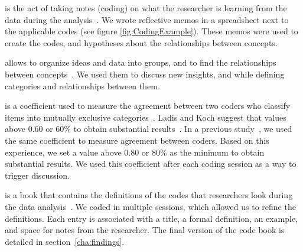 	\begin{description}[itemsep=3pt, topsep=2pt, leftmargin=3em, parsep=0pt]
		\item[Memoing] is the act of taking notes (coding) on what the researcher is learning from the data during the analysis~\cite{Groenewald2008}.%
We wrote reflective memos in a spreadsheet next to the applicable codes (see figure \ref{fig:CodingExample}).
These memos were used to create the codes, and hypotheses about the relationships between concepts.

		\item[Affinity diagrams] allows to organize ideas and data into groups, and to find the relationships between concepts~\cite{Scupin1997}.
		We used them to discuss new insights, and while defining categories and relationships between them.

		\item[Inter-rater agreement \textit{Cohen Kappa}] is a coefficient used to measure the agreement between two coders who classify items into mutually exclusive categories~\cite{Stemler2004}.
		Ladis and Koch suggest that values above 0.60 or 60\% to obtain substantial results~\cite{Landis1977}.
		In a previous study~\cite{Gomez2013}, we used the same coefficient to measure agreement between coders.
		Based on this experience, we set a value above 0.80 or 80\% as the minimum to obtain substantial results.
		We used this coefficient after each coding session as a way to trigger discussion.

		\item[Code book] is a book that contains the definitions of the codes that researchers look during the data analysis~\cite{MacQueen1998}.
		We coded in multiple sessions, which allowed us to refine the definitions.
		Each entry is associated with a title, a formal definition, an example, and space for notes from the researcher.
		The final version of the code book is detailed in section~\ref{cha:findings}.
	\end{description}


